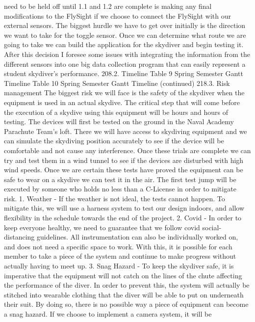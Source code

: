 need to be held off until 1.1 and 1.2 are complete is making any final modifications to the FlySight if we choose to
connect the FlySight with our external sensors.
The biggest hurdle we have to get over initially is the direction we want to take for the toggle sensor. Once we can
determine what route we are going to take we can build the application for the skydiver and begin testing it. After this
decision I foresee some issues with integrating the information from the different sensors into one big data collection
program that can easily represent a student skydiver’s performance.
208.2.
Timeline
Table 9 Spring Semester Gantt Timeline
Table 10 Spring Semester Gantt Timeline (continued)
218.3.
Risk management
The biggest risk we will face is the safety of the skydiver when the equipment is used in an actual skydive. The critical
step that will come before the execution of a skydive using this equipment will be hours and hours of testing. The
devices will first be tested on the ground in the Naval Academy Parachute Team’s loft. There we will have access to
skydiving equipment and we can simulate the skydiving position accurately to see if the device will be comfortable and
not cause any interference. Once these trials are complete we can try and test them in a wind tunnel to see if the
devices are disturbed with high wind speeds. Once we are certain these tests have proved the equipment can be safe to
wear on a skydive we can test it in the air. The first test jump will be executed by someone who holds no less than a
C-License in order to mitigate risk.
1. Weather​ - If the weather is not ideal, the tests cannot happen. To mitigate this, we will use a harness system to
test our design indoors, and allow flexibility in the schedule towards the end of the project.
2. Covid​ - In order to keep everyone healthy, we need to guarantee that we follow covid social- distancing
guidelines. All instrumentation can also be individually worked on, and does not need a specific space to work.
With this, it is possible for each member to take a piece of the system and continue to make progress without
actually having to meet up.
3. Snag Hazard​ - To keep the skydiver safe, it is imperative that the equipment will not catch on the lines of the
chute affecting the performance of the diver. In order to prevent this, the system will actually be stitched into
wearable clothing that the diver will be able to put on underneath their suit. By doing so, there is no possible
way a piece of equipment can become a snag hazard. If we choose to implement a camera system, it will be
